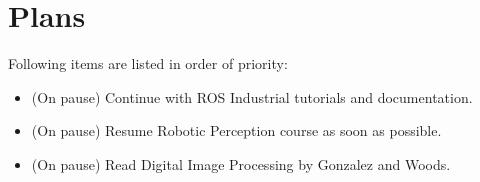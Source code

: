 \documentclass[11pt]{article}
\begin{document}
\newpage

\section{Plans}
Following items are listed in order of priority:

\begin{itemize}

	\item (On pause) Continue with ROS Industrial tutorials and documentation.

	\item (On pause) Resume Robotic Perception course as soon as possible.

	\item (On pause) Read Digital Image Processing by Gonzalez and Woods.

\end{itemize}



\newpage


\end{document}

